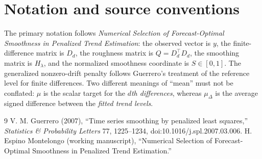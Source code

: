\documentclass[10pt,letterpaper]{article}
\begin{document}
\section{Notation and source conventions}
The primary notation follows \emph{Numerical Selection of Forecast-Optimal
Smoothness in Penalized Trend Estimation}: the observed vector is $y$, the
finite-difference matrix is $D_d$, the roughness matrix is
$Q=D_d^\top D_d$, the smoothing matrix is $H_\lambda$, and the normalized
smoothness coordinate is $S\in[0,1]$. The generalized nonzero-drift
penalty follows Guerrero's treatment of the reference level for finite
differences. Two different meanings of ``mean'' must not be conflated:
$\mu$ is the scalar target for the \emph{$d$th differences}, whereas
$\mu_\Delta$ is the average signed difference between the \emph{fitted
trend levels}.

\begin{thebibliography}{9}
V. M. Guerrero (2007), ``Time series smoothing by penalized least
squares,'' \emph{Statistics \& Probability Letters} 77, 1225--1234,
doi:10.1016/j.spl.2007.03.006.
H. Espino Montelongo (working manuscript), ``Numerical Selection of
Forecast-Optimal Smoothness in Penalized Trend Estimation.''
\end{thebibliography}
\end{document}
